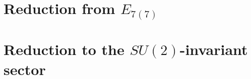 \documentclass[a4paper, 10pt, superscriptaddress, nofootinbib, showkeys, notitlepage]{revtex4-1}
\begin{document}
\section{\texorpdfstring{Reduction from $E_{7(7)}$}{Reduction from E7(7)}}
	
\section{Reduction to the \texorpdfstring{$SU(2)$}{SU(2)}-invariant sector}
	
%
% 	


\nocite{*}
\end{document}
